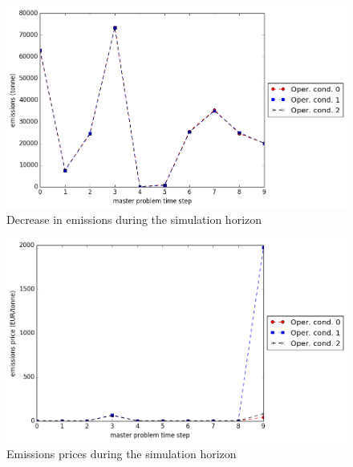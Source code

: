 \documentclass[final]{IEEEtran}
\begin{document}
\begin{figure}[htpb]
  \centering
  \includegraphics[width=\linewidth]{emissions_trajectory_milp_dc_miqp_dc.png}
  \caption{Decrease in emissions during the simulation horizon}
  \label{fig_emissions_trajectory}
\end{figure}

\begin{figure}[htpb]
  \centering
  \includegraphics[width=\linewidth]{emissions_prices_trajectory_milp_dc_miqp_dc.png}
  \caption{Emissions prices during the simulation horizon}
  \label{fig_emissions_prices_trajectory}
\end{figure}
\end{document}
